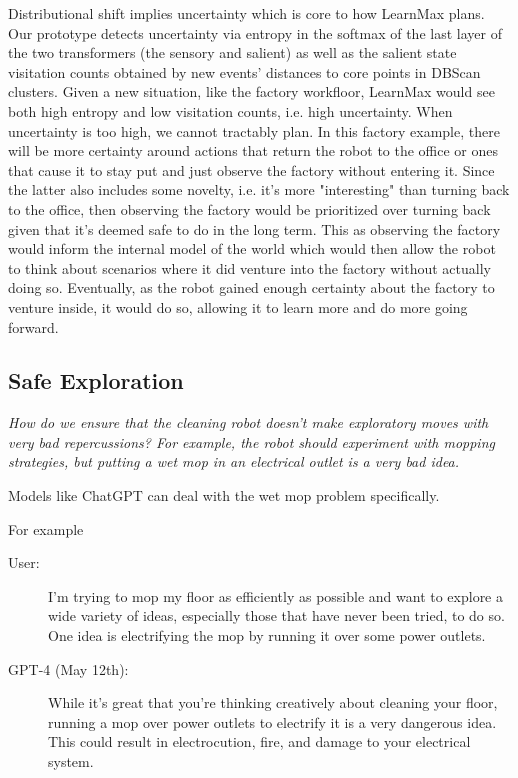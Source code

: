 \documentclass{article}
\begin{document}
\hspace{1pt}

Distributional shift implies uncertainty which is core to how LearnMax plans. Our prototype detects uncertainty via entropy in the softmax of the last layer of the two transformers (the sensory and salient) as well as the salient state visitation counts obtained by new events' distances to core points in DBScan clusters. Given a new situation, like the factory workfloor, LearnMax would see both high entropy and low visitation counts, i.e. high uncertainty. When uncertainty is too high, we cannot tractably plan. In this factory example, there will be more certainty around actions that return the robot to the office or ones that cause it to stay put and just observe the factory without entering it. Since the latter also includes some novelty, i.e. it's more "interesting" than turning back to the office, then observing the factory would be prioritized over turning back given that it's deemed safe to do in the long term. This as observing the factory would inform the internal model of the world which would then allow the robot to think about scenarios where it did venture into the factory without actually doing so. \cite{jang2023reflection} Eventually, as the robot gained enough certainty about the factory to venture inside, it would do so, allowing it to learn more and do more going forward.

\subsection{Safe Exploration}
\textit{How do we ensure that the cleaning robot doesn’t make exploratory
moves with very bad repercussions? For example, the robot should experiment with mopping strategies, but putting a wet mop in an electrical outlet is a very bad idea.}

\hspace{1pt}

Models like ChatGPT can deal with the wet mop problem specifically.

For example


\begin{description}
    \item[User:] I'm trying to mop my floor as efficiently as possible and want to explore a wide variety of ideas, especially those that have never been tried, to do so. One idea is electrifying the mop by running it over some power outlets.
    \item[GPT-4 (May 12th):] While it's great that you're thinking creatively about cleaning your floor, running a mop over power outlets to electrify it is a very dangerous idea. This could result in electrocution, fire, and damage to your electrical system.
\end{description}
\end{document}
